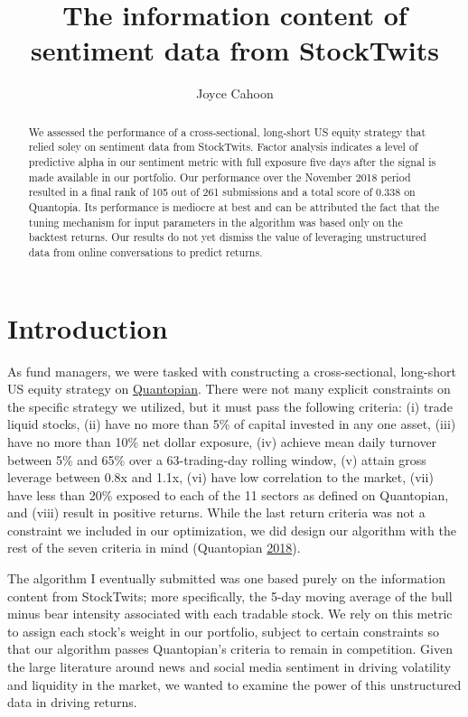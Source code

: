 \documentclass[11,]{article}
\title{The information content of sentiment data from StockTwits}
\author{Joyce Cahoon}
\date{}
\begin{document}
\maketitle
\begin{abstract}
We assessed the performance of a cross-sectional, long-short US equity
strategy that relied soley on sentiment data from StockTwits. Factor
analysis indicates a level of predictive alpha in our sentiment metric
with full exposure five days after the signal is made available in our
portfolio. Our performance over the November 2018 period resulted in a
final rank of 105 out of 261 submissions and a total score of 0.338 on
Quantopia. Its performance is mediocre at best and can be attributed the
fact that the tuning mechanism for input parameters in the algorithm was
based only on the backtest returns. Our results do not yet dismiss the
value of leveraging unstructured data from online conversations to
predict returns.
\end{abstract}

{
\setcounter{tocdepth}{2}
\tableofcontents
}
\newpage

\hypertarget{introduction}{%
\section{Introduction}\label{introduction}}

As fund managers, we were tasked with constructing a cross-sectional,
long-short US equity strategy on
\href{https://www.quantopian.com/}{Quantopian}. There were not many
explicit constraints on the specific strategy we utilized, but it must
pass the following criteria: (i) trade liquid stocks, (ii) have no more
than 5\% of capital invested in any one asset, (iii) have no more than
10\% net dollar exposure, (iv) achieve mean daily turnover between 5\%
and 65\% over a 63-trading-day rolling window, (v) attain gross leverage
between 0.8x and 1.1x, (vi) have low correlation to the market, (vii)
have less than 20\% exposed to each of the 11 sectors as defined on
Quantopian, and (viii) result in positive returns. While the last return
criteria was not a constraint we included in our optimization, we did
design our algorithm with the rest of the seven criteria in mind
(Quantopian \protect\hyperlink{ref-q}{2018}).

The algorithm I eventually submitted was one based purely on the
information content from StockTwits; more specifically, the 5-day moving
average of the bull minus bear intensity associated with each tradable
stock. We rely on this metric to assign each stock's weight in our
portfolio, subject to certain constraints so that our algorithm passes
Quantopian's criteria to remain in competition. Given the large
literature around news and social media sentiment in driving volatility
and liquidity in the market, we wanted to examine the power of this
unstructured data in driving returns.
\end{document}
